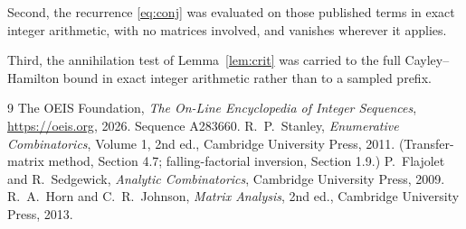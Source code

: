 \documentclass[11pt,a4paper]{article}
\theoremstyle{plain}
\theoremstyle{definition}
\begin{document}
Second, the recurrence \eqref{eq:conj} was evaluated on those published terms in exact
integer arithmetic, with no matrices involved, and vanishes wherever it applies.

Third, the annihilation test of Lemma~\ref{lem:crit} was carried to the full
Cayley--Hamilton bound in exact integer arithmetic rather than to a sampled prefix.

\begin{thebibliography}{9}
 The OEIS Foundation, \emph{The On-Line Encyclopedia of Integer
Sequences}, \url{https://oeis.org}, 2026. Sequence A283660.
 R.~P.~Stanley, \emph{Enumerative Combinatorics}, Volume 1, 2nd ed.,
Cambridge University Press, 2011. (Transfer-matrix method, Section 4.7; falling-factorial
inversion, Section 1.9.)
 P.~Flajolet and R.~Sedgewick, \emph{Analytic Combinatorics}, Cambridge
University Press, 2009.
 R.~A.~Horn and C.~R.~Johnson, \emph{Matrix Analysis}, 2nd ed., Cambridge
University Press, 2013.
\end{thebibliography}
\end{document}
